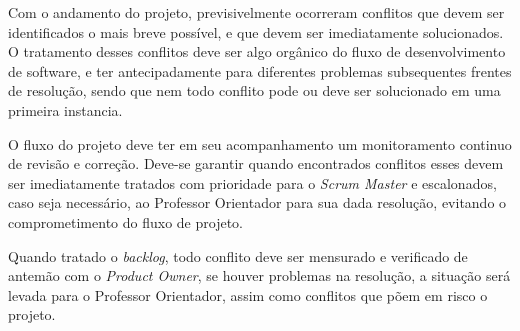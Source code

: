 \documentclass[
	12pt,				%
	oneside,			%
	a4paper,			%
	english,			%
	brazil,				%
	]{abntex2}
\begin{document}
Com o andamento do projeto, previsivelmente ocorreram conflitos que devem ser identificados o mais breve possível, e que devem ser imediatamente solucionados. O tratamento desses conflitos deve ser algo orgânico do fluxo de desenvolvimento de software, e ter antecipadamente para diferentes problemas subsequentes frentes de resolução, sendo que nem todo conflito pode ou deve ser solucionado em uma primeira instancia.

O fluxo do projeto deve ter em seu acompanhamento um monitoramento continuo de revisão e correção. Deve-se garantir quando encontrados conflitos esses devem ser imediatamente tratados com prioridade para o \textit{Scrum Master} e escalonados, caso seja necessário, ao Professor Orientador para sua dada resolução, evitando o comprometimento do fluxo de projeto.

Quando tratado o \textit{backlog}, todo conflito deve ser mensurado e verificado de antemão com o \textit{Product Owner}, se houver problemas na resolução, a situação será levada para o Professor Orientador, assim como conflitos que põem em risco o projeto.
\end{document}

